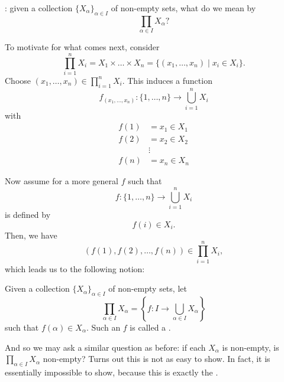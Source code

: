 \documentclass[notoc,notitlepage]{tufte-book}
\begin{document}
: given a collection ${\{X_\alpha\}}_{\alpha \in I}$ of non-empty sets, what do we mean by
\begin{equation*}
  \prod_{\alpha \in I} X_\alpha?
\end{equation*}

To motivate for what comes next, consider
\begin{equation*}
  \prod_{i=1}^{n} X_i = X_1 \times \hdots \times X_n = \{ (x_1, \ldots, x_n) \mid x_i \in X_i \}.
\end{equation*}
Choose $(x_1, \ldots, x_n) \in \prod\limits_{i=1}^{n} X_i$. This induces a function
\begin{equation*}
  f_{(x_1, \ldots, x_n)} : \{1, \ldots, n\} \to \bigcup_{i=1}^{n} X_i
\end{equation*}
with
\begin{align*}
  f(1) &= x_1 \in X_1 \\
  f(2) &= x_2 \in X_2 \\
       &\vdots \\
  f(n) &= x_n \in X_n
\end{align*}

Now assume for a more general $f$ such that
\begin{equation*}
  f: \{1, \ldots, n\} \to \bigcup_{i=1}^{n} X_i
\end{equation*}
is defined by
\begin{equation*}
  f(i) \in X_i.
\end{equation*}
Then, we have
\begin{equation*}
  ( f(1), f(2), \ldots, f(n) ) \in \prod_{i=1}^{n} X_i,
\end{equation*}
which leads us to the following notion:

\begin{defn}\label{defn:choice_function}
  Given a collection ${\{X_\alpha\}}_{\alpha \in I}$ of non-empty sets, let
  \begin{equation*}
    \prod_{\alpha \in I} X_\alpha = \left\{ f: I \to \bigcup_{\alpha \in I} X_\alpha \right\}
  \end{equation*}
  such that $f(\alpha) \in X_\alpha$. Such an $f$ is called a .
\end{defn}

And so we may ask a similar question as before: if each $X_\alpha$ is non-empty, is $\prod\limits_{\alpha \in I} X_\alpha$ non-empty? Turns out this is not as easy to show. In fact, it is essentially impossible to show, because this is exactly the .
\end{document}
